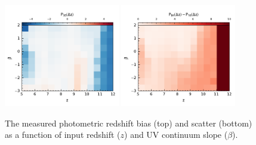 \begin{figure}
	\centering
	\includegraphics[width=0.45\textwidth]{./figures/beta/beta_bias.pdf}
  \includegraphics[width=0.45\textwidth]{./figures/beta/beta_scatter.pdf}
	\caption{The measured photometric redshift bias (top) and scatter (bottom) as a function of input redshift ($z$) and UV continuum slope ($\beta$). \label{fig:beta_bias_scatter}}
\end{figure}

